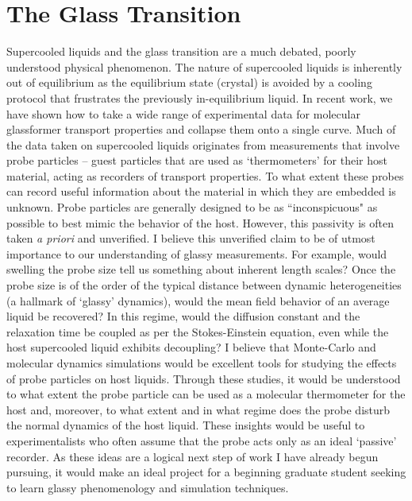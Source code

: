 \documentclass[11pt]{article}
\begin{document}
\section{The Glass Transition}
Supercooled liquids and the glass transition are a much debated, poorly understood physical phenomenon.  The nature of supercooled liquids is inherently out of equilibrium as the equilibrium state (crystal) is avoided by a cooling protocol that frustrates the previously in-equilibrium liquid.  In recent work, we have shown how to take a wide range of experimental data for molecular glassformer transport properties and collapse them onto a single curve. Much of the data taken on supercooled liquids originates from measurements that involve probe particles -- guest particles that are used as `thermometers' for their host material, acting as recorders of transport properties.  To what extent these probes can record useful information about the material in which they are embedded is unknown.  Probe particles are generally designed to be as ``inconspicuous" as possible to best mimic the behavior of the host.  However, this passivity is often taken {\it a priori} and unverified. I believe this unverified claim to be of utmost importance to our understanding of glassy measurements. For example, would swelling the probe size tell us something about inherent length scales?   Once the probe size is of the order of the typical distance between dynamic heterogeneities (a hallmark of `glassy' dynamics), would the mean field behavior of an average liquid be recovered? In this regime, would the diffusion constant and the relaxation time  be coupled as per the Stokes-Einstein equation, even while the host supercooled liquid exhibits decoupling? I believe that Monte-Carlo and molecular dynamics simulations would be excellent tools for studying the effects of probe particles on host liquids.  Through these studies, it would be understood to what extent the probe particle can be used as a molecular thermometer for the host and, moreover, to what extent and in what regime does the probe disturb the normal dynamics of the host liquid.  These insights would be useful to experimentalists who often assume that the probe acts only as an ideal `passive' recorder.  
As these ideas are a logical next step of work I have already begun pursuing, it would make an ideal project for a beginning graduate student seeking to learn glassy phenomenology and simulation techniques.  
\end{document}
